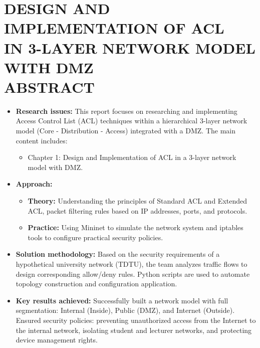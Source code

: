 \section*{\fontsize{16pt}{15pt}\selectfont DESIGN AND IMPLEMENTATION OF ACL \\IN 3-LAYER NETWORK MODEL WITH DMZ \\ABSTRACT}

\begin{itemize}
    \item[-] \textbf{Research issues:}
    This report focuses on researching and implementing Access Control List (ACL) techniques within a hierarchical 3-layer network model (Core - Distribution - Access) integrated with a DMZ. The main content includes:
        \begin{itemize}
        \item[•] Chapter 1: Design and Implementation of ACL in a 3-layer network model with DMZ.
        \end{itemize}
   
    \item[-] \textbf{Approach:}
        \begin{itemize}
        \item[•] \textbf{Theory:} Understanding the principles of Standard ACL and Extended ACL, packet filtering rules based on IP addresses, ports, and protocols.
        \item[•] \textbf{Practice:} Using Mininet to simulate the network system and iptables tools to configure practical security policies.
    \end{itemize}
    
    \item[-] \textbf{Solution methodology:}
    Based on the security requirements of a hypothetical university network (TDTU), the team analyzes traffic flows to design corresponding allow/deny rules. Python scripts are used to automate topology construction and configuration application.

    \item[-] \textbf{Key results achieved:}
    Successfully built a network model with full segmentation: Internal (Inside), Public (DMZ), and Internet (Outside). Ensured security policies: preventing unauthorized access from the Internet to the internal network, isolating student and lecturer networks, and protecting device management rights.
\end{itemize}

\newpage